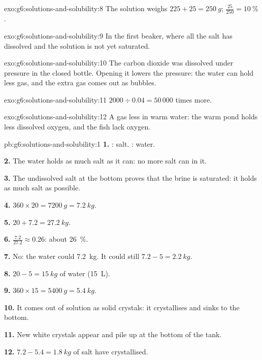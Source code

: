 \begin{solution}{exo:g6:solutions-and-solubility:8}
The solution weighs $225 + 25 = \qty{250}{g}$; $\frac{25}{250} =
\qty{10}{\percent}$.
\end{solution}

\begin{solution}{exo:g6:solutions-and-solubility:9}
In the first beaker, where all the salt has dissolved and the solution is
not yet saturated.
\end{solution}

\begin{solution}{exo:g6:solutions-and-solubility:10}
The carbon dioxide was dissolved under pressure in the closed bottle.
Opening it lowers the pressure: the water can hold less gas, and the
extra gas comes out as bubbles.
\end{solution}

\begin{solution}{exo:g6:solutions-and-solubility:11}
$2000 \div 0.04 = 50\,000$ times more.
\end{solution}

\begin{solution}{exo:g6:solutions-and-solubility:12}
A gas  less in warm water: the warm pond holds less dissolved
oxygen, and the fish lack oxygen.
\end{solution}

\begin{solution}{pb:g6:solutions-and-solubility:1}
\textbf{1.} : salt. : water.

\textbf{2.} The water holds as much salt as it can: no more salt can
 in it.

\textbf{3.} The undissolved salt at the bottom proves that the brine is
saturated: it holds as much salt as possible.

\textbf{4.} $360 \times 20 = \qty{7200}{g} = \qty{7.2}{kg}$.

\textbf{5.} $20 + 7.2 = \qty{27.2}{kg}$.

\textbf{6.} $\frac{7.2}{27.2} \approx 0.26$: about \qty{26}{\percent}.

\textbf{7.} No: the water could  \qty{7.2}{kg}. It could still
 $7.2 - 5 = \qty{2.2}{kg}$.

\textbf{8.} $20 - 5 = \qty{15}{kg}$ of water (\qty{15}{L}).

\textbf{9.} $360 \times 15 = \qty{5400}{g} = \qty{5.4}{kg}$.

\textbf{10.} It comes out of solution as solid crystals: it
crystallises and sinks to the bottom.

\textbf{11.} New white crystals appear and pile up at the bottom of the
tank.

\textbf{12.} $7.2 - 5.4 = \qty{1.8}{kg}$ of salt have crystallised.
\end{solution}
